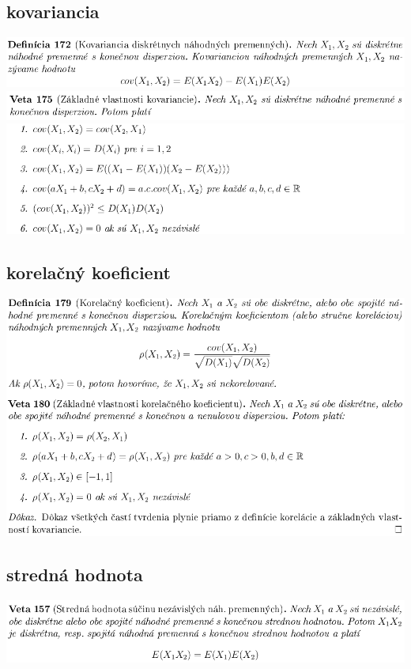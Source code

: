 \subsection {kovariancia}
\includegraphics[width=1\textwidth]{images/pravdepodobnost/kovar}\\
\includegraphics[width=1\textwidth]{images/pravdepodobnost/vlast_kovar}\\
\includegraphics[width=1\textwidth]{images/pravdepodobnost/vlast_kovar_II}\\
\subsection {korelačný koeficient}
\includegraphics[width=1\textwidth]{images/pravdepodobnost/korel_koef}\\
\subsection {stredná hodnota}
\includegraphics[width=1\textwidth]{images/pravdepodobnost/stred_hod_nah_prem}\\
